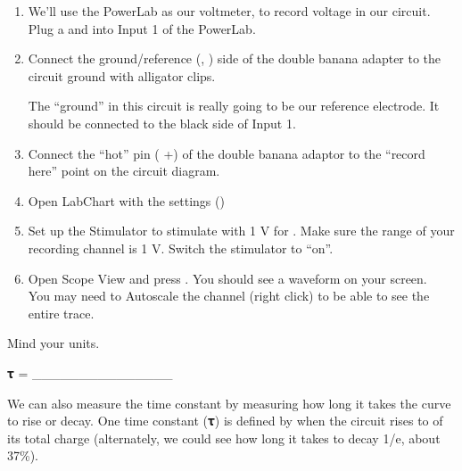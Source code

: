 \documentclass[letterpaper,10pt,english]{jupyterBook}
\begin{document}
\begin{enumerate}
\item {} 
\sphinxAtStartPar
We’ll use the PowerLab as our voltmeter, to record voltage in our circuit. Plug a  and  into Input 1 of the PowerLab.

\item {} 
\sphinxAtStartPar
Connect the ground/reference (, \sphinxhyphen{}) side of the double banana adapter to the circuit ground with alligator clips.

\sphinxAtStartPar
{} The “ground” in this circuit is really going to be our reference electrode. It should be connected to the black side of Input 1.

\item {} 
\sphinxAtStartPar
Connect the “hot” pin ( +) of the double banana adaptor to the “record here” point on the circuit diagram.

\item {} 
\sphinxAtStartPar
Open LabChart with the  settings ()

\item {} 
\sphinxAtStartPar
Set up the Stimulator to stimulate with 1 V for . Make sure the range of your recording channel is 1 V.  Switch the stimulator to “on”.

\item {} 
\sphinxAtStartPar
Open Scope View and press . You should see a waveform on your screen.\\
 You may need to Autoscale the channel (right click) to be able to see the entire trace.

\end{enumerate}

\sphinxAtStartPar
{} Mind your units. 

\sphinxAtStartPar
𝛕 = \_\_\_\_\_\_\_\_\_\_\_\_\_\_\_

\sphinxAtStartPar
We can also measure the time constant by measuring how long it takes the curve to rise or decay. One time constant (𝛕) is defined by when the circuit rises to  of its total charge (alternately, we could see how long it takes to decay 1/e, about 37\%).
\end{document}
